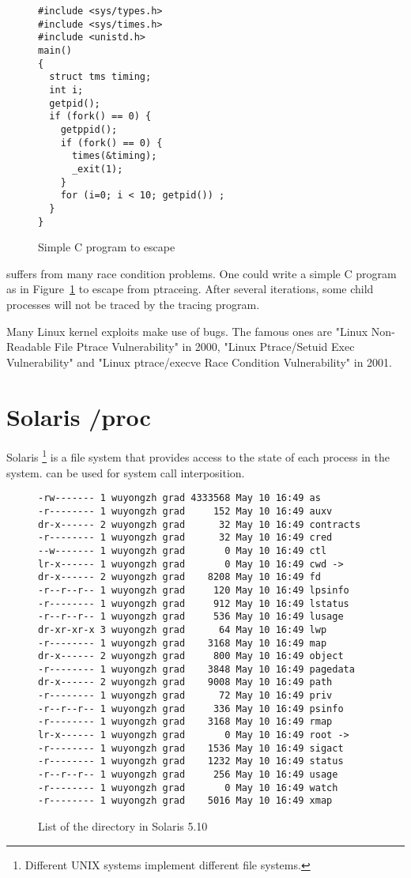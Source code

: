 \begin{figure}[htb]
\begin{verbatim}
#include <sys/types.h>
#include <sys/times.h>
#include <unistd.h>
main()
{
  struct tms timing;
  int i;
  getpid();
  if (fork() == 0) {
    getppid();
    if (fork() == 0) {
      times(&timing);
      _exit(1);
    }
    for (i=0; i < 10; getpid()) ;
  }
}
\end{verbatim}
\caption{Simple C program to escape }
\label{fig:ptrace-bug}
\end{figure}

suffers from many race condition problems\cite{garfinkel2003traps}. One could write a simple C
program as in Figure~\ref{fig:ptrace-bug} to escape from ptraceing. After several iterations, some
child processes will not be traced by the tracing program.

Many Linux kernel
exploits make use of  bugs. The famous ones are "Linux Non-Readable File
Ptrace Vulnerability" in 2000, "Linux Ptrace/Setuid Exec Vulnerability" and
"Linux ptrace/execve Race Condition Vulnerability" in 2001.

\section{Solaris /proc}

Solaris \cite{faulkner1991process}\footnote{Different UNIX systems implement
different  file systems.}
is a file system that provides access to the state of each process
in the system.  can be used for system call interposition.

\begin{figure}[htb]
\begin{verbatim}
-rw------- 1 wuyongzh grad 4333568 May 10 16:49 as
-r-------- 1 wuyongzh grad     152 May 10 16:49 auxv
dr-x------ 2 wuyongzh grad      32 May 10 16:49 contracts
-r-------- 1 wuyongzh grad      32 May 10 16:49 cred
--w------- 1 wuyongzh grad       0 May 10 16:49 ctl
lr-x------ 1 wuyongzh grad       0 May 10 16:49 cwd ->
dr-x------ 2 wuyongzh grad    8208 May 10 16:49 fd
-r--r--r-- 1 wuyongzh grad     120 May 10 16:49 lpsinfo
-r-------- 1 wuyongzh grad     912 May 10 16:49 lstatus
-r--r--r-- 1 wuyongzh grad     536 May 10 16:49 lusage
dr-xr-xr-x 3 wuyongzh grad      64 May 10 16:49 lwp
-r-------- 1 wuyongzh grad    3168 May 10 16:49 map
dr-x------ 2 wuyongzh grad     800 May 10 16:49 object
-r-------- 1 wuyongzh grad    3848 May 10 16:49 pagedata
dr-x------ 2 wuyongzh grad    9008 May 10 16:49 path
-r-------- 1 wuyongzh grad      72 May 10 16:49 priv
-r--r--r-- 1 wuyongzh grad     336 May 10 16:49 psinfo
-r-------- 1 wuyongzh grad    3168 May 10 16:49 rmap
lr-x------ 1 wuyongzh grad       0 May 10 16:49 root ->
-r-------- 1 wuyongzh grad    1536 May 10 16:49 sigact
-r-------- 1 wuyongzh grad    1232 May 10 16:49 status
-r--r--r-- 1 wuyongzh grad     256 May 10 16:49 usage
-r-------- 1 wuyongzh grad       0 May 10 16:49 watch
-r-------- 1 wuyongzh grad    5016 May 10 16:49 xmap
\end{verbatim}
\caption{List of the  directory in Solaris 5.10}
\label{fig:proc}
\end{figure}

